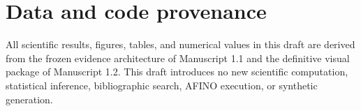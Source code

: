 \documentclass[11pt,a4paper]{article}
\begin{document}
\section*{Data and code provenance}
All scientific results, figures, tables, and numerical values in this draft are derived from the frozen evidence architecture of Manuscript 1.1 and the definitive visual package of Manuscript 1.2. This draft introduces no new scientific computation, statistical inference, bibliographic search, AFINO execution, or synthetic generation.

\printbibliography
\end{document}
